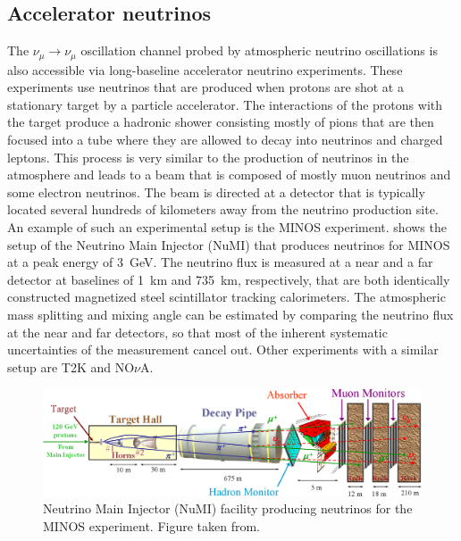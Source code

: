 \subsection{Accelerator neutrinos}
The $\nu_\mu \rightarrow \nu_\mu$ oscillation channel probed by atmospheric neutrino oscillations is also accessible via long-baseline accelerator neutrino experiments.
These experiments use neutrinos that are produced when protons are shot at a stationary target by a particle accelerator.
The interactions of the protons with the target produce a hadronic shower consisting mostly of pions that are then focused into a tube where they are allowed to decay into neutrinos and charged leptons.
This process is very similar to the production of neutrinos in the atmosphere and leads to a beam that is composed of mostly muon neutrinos and some electron neutrinos.
The beam is directed at a detector that is typically located several hundreds of kilometers away from the neutrino production site.
An example of such an experimental setup is the MINOS experiment\cite{MICHAEL2008190}.
 shows the setup of the Neutrino Main Injector (NuMI) that produces neutrinos for MINOS at a peak energy of \SI{3}{GeV}.
The neutrino flux is measured at a near and a far detector at baselines of \SI{1}{km} and \SI{735}{km}, respectively, that are both identically constructed magnetized steel scintillator tracking calorimeters.
The atmospheric mass splitting and mixing angle can be estimated by comparing the neutrino flux at the near and far detectors, so that most of the inherent systematic uncertainties of the measurement cancel out.
Other experiments with a similar setup are T2K\cite{T2K:2011qtm} and NO$\nu$A\cite{Patterson:2012zs}.
\begin{figure}
    \centering
    \includegraphics{figures/theory/numi_beam.png}
    \caption{Neutrino Main Injector (NuMI) facility producing neutrinos for the MINOS experiment. Figure taken from\cite{osti_879065}.\label{fig:numi-beam}}
\end{figure}

